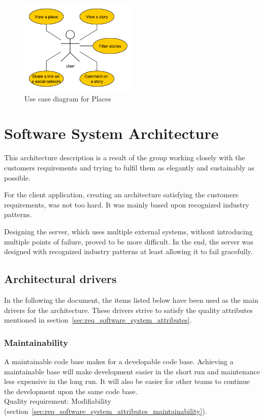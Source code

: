 \documentclass[11pt]{book}
\begin{document}
\begin{figure}[H]
      \centering
      \includegraphics[width=0.5\textwidth]{Figures/Requirements/final.pdf}
      \caption{Use case diagram for Places}
      \label{fig:req_usecase_walls}
\end{figure}

\chapter{Software System Architecture}\label{chap:architecture}
This architecture description is a result of the group working closely with the customers requirements and trying to fulfil them as elegantly and sustainably as possible.

For the client application, creating an architecture satisfying the customers requirements, was not too hard. It was  mainly based upon recognized industry patterns.

Designing the server, which uses multiple external systems, without introducing multiple points of failure, proved to be more difficult. In the end, the server was designed with recognized industry patterns at least allowing it to fail gracefully.

\section{Architectural drivers} \label{sec:architecture_drivers}
In the following the document, the items listed below have been used as the main drivers for the architecture. These drivers strive to satisfy the quality attributes mentioned in section~\ref{sec:req_software_system_attributes}.

\subsection{Maintainability} 
A maintainable code base makes for a developable code base. Achieving a maintainable base will make development easier in the short run and maintenance less expensive in the long run. It will also be easier for other teams to continue the development upon the same code base.\\
Quality requirement: Modifiability (section~\ref{sec:req_software_system_attributes_maintainability}).
\end{document}
